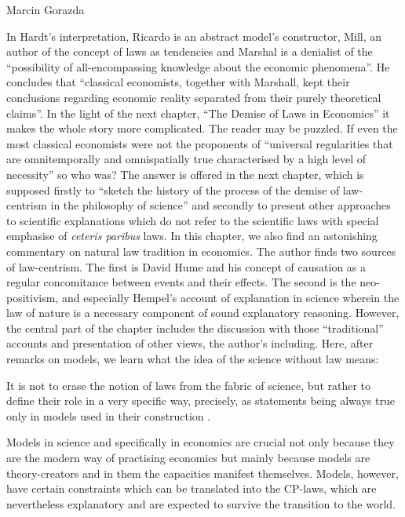 \begin{recengenv}{Marcin Gorazda}
\enlargethispage{-.5\baselineskip}

In Hardt’s interpretation, Ricardo is an abstract model’s constructor, Mill, an author of the concept of laws as
tendencies and Marshal is a denialist of the ``possibility of all-encompassing knowledge about the economic phenomena''.
He concludes that ``classical economists, together with Marshall, kept their conclusions regarding economic reality
separated from their purely theoretical claims''. In the light of the next chapter, ``The Demise of Laws in Economics'' it
makes the whole story more complicated. The reader may be puzzled. If even the most classical economists were not the
proponents of ``universal regularities that are omnitemporally and omnispatially true characterised by a high level of
necessity'' so who was? The answer is offered in the next chapter, which is supposed firstly to ``sketch the history of
the process of the demise of law-centrism in the philosophy of science'' and secondly to present other approaches to
scientific explanations which do not refer to the scientific laws with special emphasise of \textit{ceteris paribus} laws. In
this chapter, we also find an astonishing commentary on natural law tradition in economics. The author finds two
sources of law-centrism. The first is David Hume and his concept of causation as a regular concomitance between events
and their effects. The second is the neo-positivism, and especially Hempel’s account of explanation in science wherein
the law of nature is a necessary component of sound explanatory reasoning. However, the central part of the chapter
includes the discussion with those ``traditional'' accounts and presentation of other views, the author’s including.
Here, after remarks on models, we learn what the idea of the science without law means:

\begin{myquoterev}
It is not to erase the notion of laws from the fabric of science, but rather to define their role in a very specific
way, precisely, as statements being always true only in models used in their construction
\parencite[p.78]{hardt_economics_2017}.
\end{myquoterev}

Models in science and specifically in economics are crucial not only because they are the modern way of practising
economics but mainly because models are theory-creators and in them the capacities manifest themselves. Models,
however, have certain constraints which can be translated into the CP-laws, which are nevertheless explanatory and are
expected to survive the transition to the world. 


\end{recengenv}
